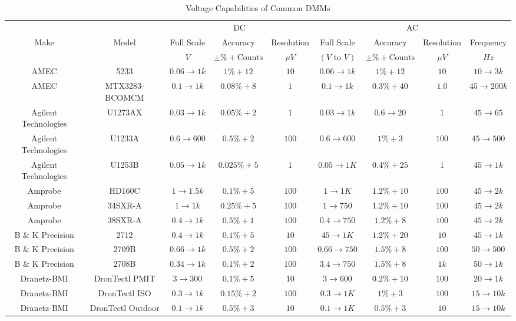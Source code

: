 \begin{table}
    \centering
    \caption{Voltage Capabilities of Common DMMs}
    \label{tab:ac_com_dmms}
    \begin{tabular}{cc|ccc|cccc}\hline
        & & \multicolumn{3}{c|}{DC}& \multicolumn{4}{c}{AC}\\\cline{3-9}
        Make& Model& Full Scale& Accuracy& Resolution& Full Scale& Accuracy& Resolution& Frequency\\
        & & $V$& $\pm\%+\text{Counts}$& $\mu V$& $(V\text{ to }V)$& $\pm\%+\text{Counts}$& $\mu V$& $Hz$\\\hline
        AMEC& 5233& $0.06\to1k$& $1\%+12$& $10$& $0.06\to1k$& $1\%+12$& $10$& $10\to3k$\\
        AMEC& MTX3283-BCOMCM& $0.1\to1k$& $0.08\%+8$& $1$& $0.1\to1k$& $0.3\%+40$& $1.0$& $45\to200k$\\\hline
        Agilent Technologies& U1273AX& $0.03\to1k$& $0.05\%+2$& $1$& $0.03\to1k$& $0.6\to20$& $1$& $45\to65$\\
        Agilent Technologies& U1233A& $0.6\to600$& $0.5\%+2$& $100$& $0.6\to600$& $1\%+3$& $100$& $45\to500$\\
        Agilent Technologies& U1253B& $0.05\to1k$& $0.025\%+5$& $1$& $0.05\to1K$& $0.4\%+25$& $1$& $45\to1k$\\\hline
        Amprobe& HD160C& $1\to1.5k$& $0.1\%+5$& $100$& $1\to1K$& $1.2\%+10$& $100$& $45\to2k$\\
        Amprobe& 34SXR-A& $1\to1k$& $0.25\%+5$& $100$& $1\to750$& $1.2\%+10$& $100$& $45\to2k$\\
        Amprobe& 38SXR-A& $0.4\to1k$& $0.5\%+1$& $100$& $0.4\to750$& $1.2\%+8$& $100$& $45\to2k$\\\hline
        B \& K Precision& 2712& $0.4\to1k$& $0.1\%+5$& $10$& $45\to1K$& $1.2\%+20$& $10$& $45\to1k$\\
        B \& K Precision& 2709B& $0.66\to1k$& $0.5\%+2$& $100$& $0.66\to750$& $1.5\%+8$& $100$& $50\to500$\\
        B \& K Precision& 2708B& $0.34\to1k$& $0.1\%+2$& $100$& $3.4\to750$& $1.5\%+8$& $1k$& $50\to1k$\\\hline
        Dranetz-BMI& DronTectl PMIT& $3\to300$& $0.1\%+5$& $10$& $3\to600$& $0.2\%+10$& $100$& $20\to1k$\\
        Dranetz-BMI& DronTectl ISO& $0.3\to1k$& $0.15\%+2$& $100$& $0.3\to1K$& $1\%+3$& $100$& $15\to10k$\\
        Dranetz-BMI& DronTectl Outdoor& $0.1\to1k$& $0.5\%+3$& $10$& $0.1\to1K$& $0.5\%+3$& $10$& $15\to10k$\\\hline

\end{tabular}
\end{table}
